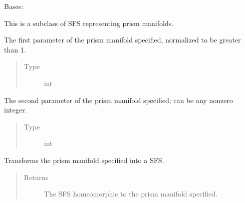 \documentclass[letterpaper,10pt,english]{sphinxmanual}
\begin{document}
\begin{fulllineitems}
\label{\detokenize{soapy:soapy.Prism}}
\sphinxAtStartPar
Bases: {\hyperref[\detokenize{soapy:soapy.SFS}]{}}

\sphinxAtStartPar
This is a subclass of SFS representing prism manifolds.

\begin{fulllineitems}
\label{\detokenize{soapy:soapy.Prism.p}}
\sphinxAtStartPar
The first parameter of the prism manifold specified, normalized to be greater than 1.
\begin{quote}\begin{description}
\item[{Type}] \leavevmode
\sphinxAtStartPar
int

\end{description}\end{quote}

\end{fulllineitems}


\begin{fulllineitems}
\label{\detokenize{soapy:soapy.Prism.q}}
\sphinxAtStartPar
The second parameter of the prism manifold specified; can be any non\sphinxhyphen{}zero integer.
\begin{quote}\begin{description}
\item[{Type}] \leavevmode
\sphinxAtStartPar
int

\end{description}\end{quote}

\end{fulllineitems}


\begin{fulllineitems}
\label{\detokenize{soapy:soapy.Prism.to_SFS}}
\sphinxAtStartPar
Transforms the prism manifold specified into a SFS.
\begin{quote}\begin{description}
\item[{Returns}] \leavevmode
\sphinxAtStartPar
The SFS homeomorphic to the prism manifold specified.


\end{description}
\end{quote}
\end{fulllineitems}
\end{fulllineitems}
\end{document}
